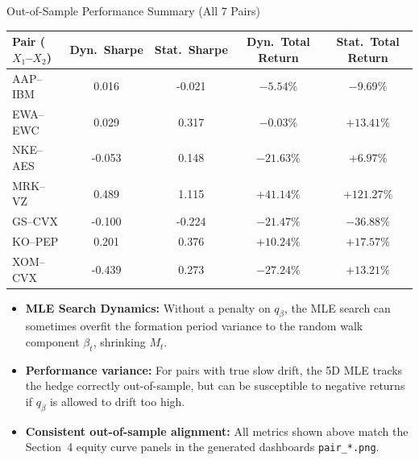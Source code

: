 \documentclass[10pt, aspectratio=169]{beamer}
\begin{document}
\begin{frame}{Out-of-Sample Performance Summary (All 7 Pairs)}
  \small
  \begin{table}[h]
    \centering
    \begin{tabular}{@{}lcccc@{}}
      \toprule
      \textbf{Pair ($X_1$--$X_2$)} & \textbf{Dyn.\ Sharpe} & \textbf{Stat.\ Sharpe} & \textbf{Dyn.\ Total Return} & \textbf{Stat.\ Total Return} \\
      \midrule
      AAP--IBM  & 0.016  & -0.021 & $-5.54\%$  & $-9.69\%$  \\
      EWA--EWC  & 0.029  & 0.317  & $-0.03\%$  & $+13.41\%$ \\
      NKE--AES  & -0.053 & 0.148  & $-21.63\%$ & $+6.97\%$  \\
      MRK--VZ   & 0.489  & 1.115  & $+41.14\%$ & $+121.27\%$\\
      GS--CVX   & -0.100 & -0.224 & $-21.47\%$ & $-36.88\%$ \\
      KO--PEP   & 0.201  & 0.376  & $+10.24\%$ & $+17.57\%$ \\
      XOM--CVX  & -0.439 & 0.273  & $-27.24\%$ & $+13.21\%$ \\
      \bottomrule
    \end{tabular}
  \end{table}
  \vspace{4pt}
  \begin{itemize}
    \item \textbf{MLE Search Dynamics:} Without a penalty on $q_\beta$, the MLE search can sometimes overfit the formation period variance to the random walk component $\beta_t$, shrinking $M_t$.
    \item \textbf{Performance variance:} For pairs with true slow drift, the 5D MLE tracks the hedge correctly out-of-sample, but can be susceptible to negative returns if $q_\beta$ is allowed to drift too high.
    \item \textbf{Consistent out-of-sample alignment:} All metrics shown above match the Section~4
          equity curve panels in the generated dashboards \texttt{pair\_*.png}.
  \end{itemize}
\end{frame}
\end{document}

